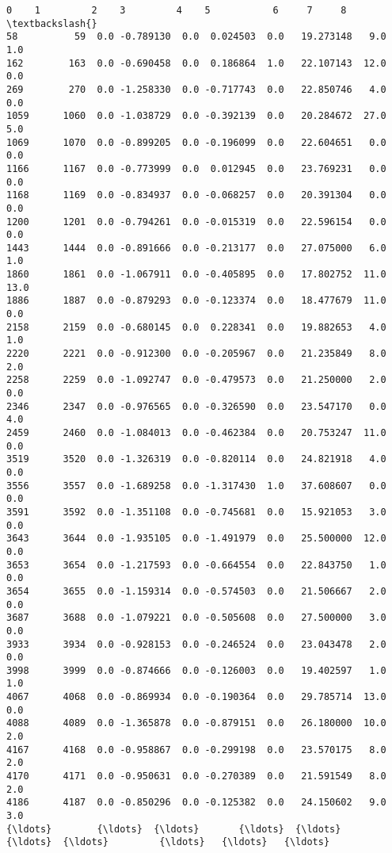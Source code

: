 \documentclass[11pt]{article}
\begin{document}
    \begin{Verbatim}[commandchars=\\\{\}]
            0    1         2    3         4    5           6     7     8   \textbackslash{}
58          59  0.0 -0.789130  0.0  0.024503  0.0   19.273148   9.0   1.0   
162        163  0.0 -0.690458  0.0  0.186864  1.0   22.107143  12.0   0.0   
269        270  0.0 -1.258330  0.0 -0.717743  0.0   22.850746   4.0   0.0   
1059      1060  0.0 -1.038729  0.0 -0.392139  0.0   20.284672  27.0   5.0   
1069      1070  0.0 -0.899205  0.0 -0.196099  0.0   22.604651   0.0   0.0   
1166      1167  0.0 -0.773999  0.0  0.012945  0.0   23.769231   0.0   0.0   
1168      1169  0.0 -0.834937  0.0 -0.068257  0.0   20.391304   0.0   0.0   
1200      1201  0.0 -0.794261  0.0 -0.015319  0.0   22.596154   0.0   0.0   
1443      1444  0.0 -0.891666  0.0 -0.213177  0.0   27.075000   6.0   1.0   
1860      1861  0.0 -1.067911  0.0 -0.405895  0.0   17.802752  11.0  13.0   
1886      1887  0.0 -0.879293  0.0 -0.123374  0.0   18.477679  11.0   0.0   
2158      2159  0.0 -0.680145  0.0  0.228341  0.0   19.882653   4.0   1.0   
2220      2221  0.0 -0.912300  0.0 -0.205967  0.0   21.235849   8.0   2.0   
2258      2259  0.0 -1.092747  0.0 -0.479573  0.0   21.250000   2.0   0.0   
2346      2347  0.0 -0.976565  0.0 -0.326590  0.0   23.547170   0.0   4.0   
2459      2460  0.0 -1.084013  0.0 -0.462384  0.0   20.753247  11.0   0.0   
3519      3520  0.0 -1.326319  0.0 -0.820114  0.0   24.821918   4.0   0.0   
3556      3557  0.0 -1.689258  0.0 -1.317430  1.0   37.608607   0.0   0.0   
3591      3592  0.0 -1.351108  0.0 -0.745681  0.0   15.921053   3.0   0.0   
3643      3644  0.0 -1.935105  0.0 -1.491979  0.0   25.500000  12.0   0.0   
3653      3654  0.0 -1.217593  0.0 -0.664554  0.0   22.843750   1.0   0.0   
3654      3655  0.0 -1.159314  0.0 -0.574503  0.0   21.506667   2.0   0.0   
3687      3688  0.0 -1.079221  0.0 -0.505608  0.0   27.500000   3.0   0.0   
3933      3934  0.0 -0.928153  0.0 -0.246524  0.0   23.043478   2.0   0.0   
3998      3999  0.0 -0.874666  0.0 -0.126003  0.0   19.402597   1.0   1.0   
4067      4068  0.0 -0.869934  0.0 -0.190364  0.0   29.785714  13.0   0.0   
4088      4089  0.0 -1.365878  0.0 -0.879151  0.0   26.180000  10.0   2.0   
4167      4168  0.0 -0.958867  0.0 -0.299198  0.0   23.570175   8.0   2.0   
4170      4171  0.0 -0.950631  0.0 -0.270389  0.0   21.591549   8.0   2.0   
4186      4187  0.0 -0.850296  0.0 -0.125382  0.0   24.150602   9.0   3.0   
{\ldots}        {\ldots}  {\ldots}       {\ldots}  {\ldots}       {\ldots}  {\ldots}         {\ldots}   {\ldots}   {\ldots}   

\end{Verbatim}
\end{document}
